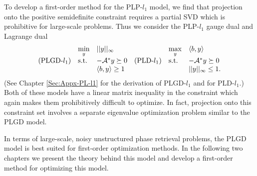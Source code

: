 \begin{enumerate}
To develop a first-order method for the PLP-$l_1$ model, we find that projection onto the positive semidefinite constraint requires a partial SVD which is prohibitive for large-scale problems.  Thus we consider the PLP-$l_1$ gauge dual and Lagrange dual 
\begin{equation} 			\label{Eqn:PhaseLift_l-1_norm_model_dual}
\begin{array}{llllll}

	&	\min\limits_{y}
		&	||y||_\infty
			&&	\max\limits_y
				& \langle b, y \rangle
					\\
			
(\textnormal{PLGD-}l_1)		

	&	\textnormal{s.t.}
		&	-{\mathcal A}^*y \succeq 0
			&(\textnormal{PLD-}l_1)&	\textnormal{s.t.}
				&	- {\mathcal A}^*y \succeq 0
					\\
			
			&&	\langle b, y \rangle \geq 1 &&&	||y||_\infty \leq 1.
\end{array}
\end{equation}
(See Chapter \ref{Sec:Appx-PL-l1} for the derivation of PLGD-$l_1$ and  \cite[Chapter 5]{boyd2004convex} for PLD-$l_1$.)   Both of these models have a linear matrix inequality in the constraint which again makes them prohibitively difficult to optimize.  In fact, projection onto this constraint set involves a separate eigenvalue optimization problem similar to the PLGD model.  


\end{enumerate}



In terms of large-scale, noisy unstructured phase retrieval problems, the PLGD model is best suited for first-order optimization methods.  In the following two chapters we present the theory behind this model and develop a first-order method for optimizing this model.


